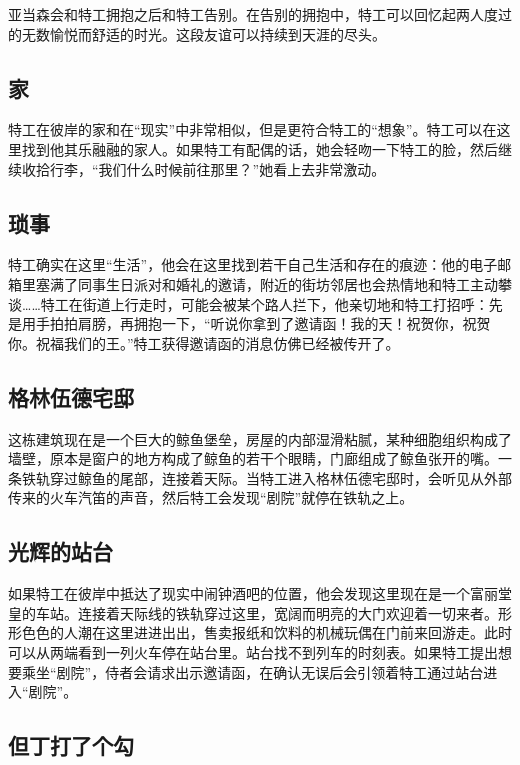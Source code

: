 亚当森会和特工拥抱之后和特工告别。在告别的拥抱中，特工可以回忆起两人度过的无数愉悦而舒适的时光。这段友谊可以持续到天涯的尽头。

\subsection{家}

特工在彼岸的家和在“现实”中非常相似，但是更符合特工的“想象”。特工可以在这里找到他其乐融融的家人。如果特工有配偶的话，她会轻吻一下特工的脸，然后继续收拾行李，“我们什么时候前往那里？”她看上去非常激动。

\subsection{琐事}

特工确实在这里“生活”，他会在这里找到若干自己生活和存在的痕迹：他的电子邮箱里塞满了同事生日派对和婚礼的邀请，附近的街坊邻居也会热情地和特工主动攀谈……特工在街道上行走时，可能会被某个路人拦下，他亲切地和特工打招呼：先是用手拍拍肩膀，再拥抱一下，“听说你拿到了邀请函！我的天！祝贺你，祝贺你。祝福我们的王。”特工获得邀请函的消息仿佛已经被传开了。

\subsection{格林伍德宅邸}

这栋建筑现在是一个巨大的鲸鱼堡垒，房屋的内部湿滑粘腻，某种细胞组织构成了墙壁，原本是窗户的地方构成了鲸鱼的若干个眼睛，门廊组成了鲸鱼张开的嘴。一条铁轨穿过鲸鱼的尾部，连接着天际。当特工进入格林伍德宅邸时，会听见从外部传来的火车汽笛的声音，然后特工会发现“剧院”就停在铁轨之上。

\subsection{光辉的站台}

如果特工在彼岸中抵达了现实中闹钟酒吧的位置，他会发现这里现在是一个富丽堂皇的车站。连接着天际线的铁轨穿过这里，宽阔而明亮的大门欢迎着一切来者。形形色色的人潮在这里进进出出，售卖报纸和饮料的机械玩偶在门前来回游走。此时可以从两端看到一列火车停在站台里。站台找不到列车的时刻表。如果特工提出想要乘坐“剧院”，侍者会请求出示邀请函，在确认无误后会引领着特工通过站台进入“剧院”。

\subsection{但丁打了个勾}

